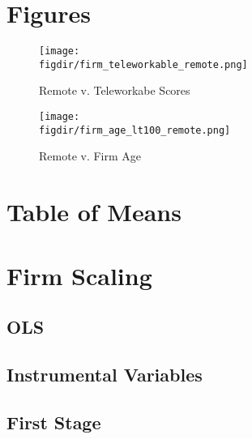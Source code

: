 \documentclass{article}
\newcommand{\cleanedresultsdir}{../../results/cleaned}
\newcommand{\figdir}{../../results/figures}
\begin{document}
\section{Figures}

\begin{figure}[H]
  \centering
  \texttt{[image: \\figdir/firm\_teleworkable\_remote.png]}
  \caption{Remote v. Teleworkabe Scores}
\end{figure}

\begin{figure}[H]
  \centering
  \texttt{[image: \\figdir/firm\_age\_lt100\_remote.png]}
  \caption{Remote v. Firm Age}
\end{figure}


\section{Table of Means}



\clearpage
\section{Firm Scaling}
\label{sec:firm_scaling}

\subsection{OLS}


\subsection{Instrumental Variables}


\subsection{First Stage}

\end{document}
